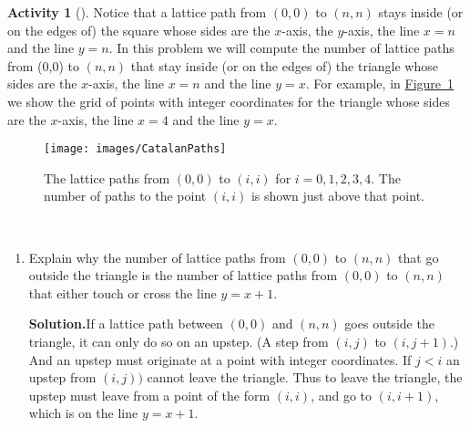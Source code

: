 \documentclass[10pt,]{book}
\theoremstyle{plain}
\theoremstyle{definition}
\newtheorem{activity}[project]{Activity}
\numberwithin{equation}{chapter}
\newcommand{\lt}{<}
\begin{document}
\begin{activity}[]\label{activity-5}
Notice that a lattice path from \((0,0)\) to \((n,n)\) stays inside (or on the edges of) the square whose sides are the \(x\)-axis, the \(y\)-axis, the line \(x=n\) and the line \(y=n\). In this problem we will compute the number of lattice paths from (0,0) to \((n,n)\) that stay inside (or on the edges of) the triangle whose sides are the \(x\)-axis, the line \(x=n\) and the line \(y=x\). For example, in \hyperref[CatalanPaths]{Figure~\ref{CatalanPaths}} we show the grid of points with integer coordinates for the triangle whose sides are the \(x\)-axis, the line \(x=4\) and the line \(y=x\).%
\begin{figure}
\centering
\texttt{[image: images/CatalanPaths]}
\caption{The lattice paths from \((0,0)\) to \((i,i)\) for \(i=0,1,2,3,4\).  The number of paths to the point \((i,i)\) is shown just above that point.\label{CatalanPaths}}
\end{figure}
~\par
\begin{enumerate}[label=(\alph*)]
 \item Explain why the number of lattice paths from \((0,0)\) to \((n,n)\) that go outside the triangle is the number of lattice paths from \((0,0)\) to \((n,n)\) that either touch or cross the line \(y=x+1\).%
\par\medskip\noindent%
\textbf{Solution.}\quad If a lattice path between \((0,0)\) and \((n,n)\) goes outside the triangle, it can only do so on an upstep. (A step from \((i,j)\) to \((i,j+1)\).) And an upstep must originate at a point with integer coordinates. If \(j\lt i\) an upstep from \((i,j))\) cannot leave the triangle. Thus to leave the triangle, the upstep must leave from a point of the form \((i,i)\), and go to \((i,i+1)\), which is on the line \(y=x+1\).%


\end{enumerate}
\end{activity}
\end{document}
